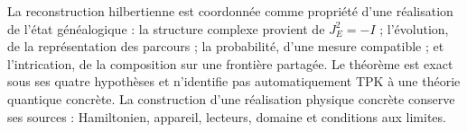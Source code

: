 \begin{statusbox}[title={Résultat et portée}]
La reconstruction hilbertienne est coordonnée comme propriété d’une réalisation de l’état généalogique : la structure complexe provient de \(J_E^2=-I\) ; l’évolution, de la représentation des parcours ; la probabilité, d’une mesure compatible ; et l’intrication, de la composition sur une frontière partagée. Le théorème est exact sous ses quatre hypothèses et n’identifie pas automatiquement TPK à une théorie quantique concrète. La construction d’une réalisation physique concrète conserve ses sources : Hamiltonien, appareil, lecteurs, domaine et conditions aux limites.
\end{statusbox}

